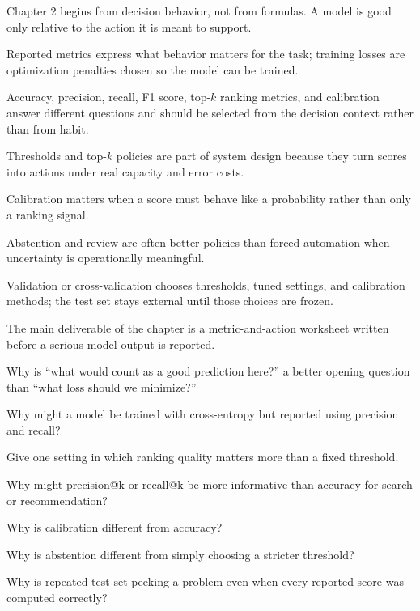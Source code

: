 \begin{chaptersummary}
\item Chapter 2 begins from decision behavior, not from formulas. A model is good only relative to the action it is meant to support.
\item Reported metrics express what behavior matters for the task; training losses are optimization penalties chosen so the model can be trained.
\item Accuracy, precision, recall, F1 score, top-$k$ ranking metrics, and calibration answer different questions and should be selected from the decision context rather than from habit.
\item Thresholds and top-$k$ policies are part of system design because they turn scores into actions under real capacity and error costs.
\item Calibration matters when a score must behave like a probability rather than only a ranking signal.
\item Abstention and review are often better policies than forced automation when uncertainty is operationally meaningful.
\item Validation or cross-validation chooses thresholds, tuned settings, and calibration methods; the test set stays external until those choices are frozen.
\item The main deliverable of the chapter is a metric-and-action worksheet written before a serious model output is reported.
\end{chaptersummary}

\begin{studyquestions}
\item Why is ``what would count as a good prediction here?'' a better opening question than ``what loss should we minimize?'' 
\item Why might a model be trained with cross-entropy but reported using precision and recall?
\item Give one setting in which ranking quality matters more than a fixed threshold.
\item Why might precision@k or recall@k be more informative than accuracy for search or recommendation?
\item Why is calibration different from accuracy?
\item Why is abstention different from simply choosing a stricter threshold?
\item Why is repeated test-set peeking a problem even when every reported score was computed correctly?
\end{studyquestions}

